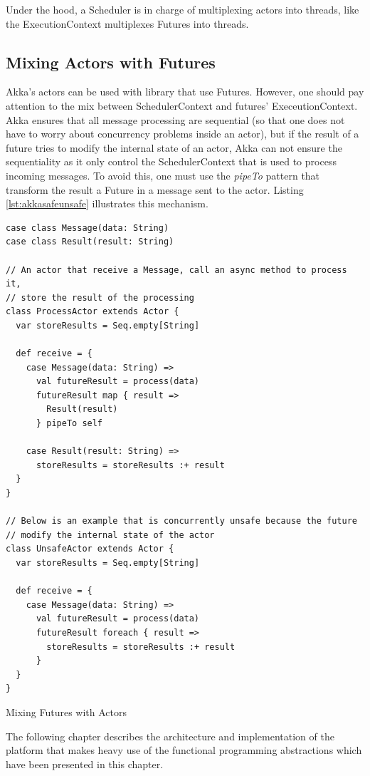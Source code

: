 Under the hood, a Scheduler is in charge of multiplexing actors into threads, like the ExecutionContext multiplexes Futures into threads.

\subsection{Mixing Actors with Futures}
\label{sec:mixingactorfuture}

Akka's actors can be used with library that use Futures. However, one should pay attention to the mix between SchedulerContext 
and futures' ExeceutionContext. Akka ensures that all message processing are sequential (so that one does not have to worry about concurrency problems inside
an actor), but if the result of a future tries to modify the internal state of an actor, Akka can not ensure the sequentiality as it only control the SchedulerContext
that is used to process incoming messages. To avoid this, one must use the \textit{pipeTo} pattern that transform the result a Future in a message sent to the actor.
Listing \ref{lst:akkasafeunsafe} illustrates this mechanism.

\begin{listing}[h]
\begin{verbatim}
case class Message(data: String)
case class Result(result: String)

// An actor that receive a Message, call an async method to process it,
// store the result of the processing
class ProcessActor extends Actor {
  var storeResults = Seq.empty[String]

  def receive = {
    case Message(data: String) => 
      val futureResult = process(data)
      futureResult map { result =>
        Result(result)
      } pipeTo self

    case Result(result: String) =>
      storeResults = storeResults :+ result
  }
}

// Below is an example that is concurrently unsafe because the future 
// modify the internal state of the actor
class UnsafeActor extends Actor {
  var storeResults = Seq.empty[String]

  def receive = {
    case Message(data: String) => 
      val futureResult = process(data)
      futureResult foreach { result =>
        storeResults = storeResults :+ result
      }
  }
}
\end{verbatim}
\caption{Mixing Futures with Actors}
\label{lst:akkasafeunsafe}
\end{listing}

The following chapter describes the architecture and implementation of the platform that makes heavy use of the functional programming abstractions which have been 
presented in this chapter.


